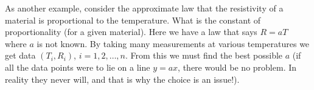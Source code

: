 \documentclass[preprint,  11pt]{amsart}
\newcommand{\para}[1]{\vspace{4mm}\noindent{\bfseries #1:}}
\theoremstyle{plain} %
\theoremstyle{definition} %
\begin{document}
As another example, consider the approximate law that the resistivity of a  material is proportional to the temperature. What is the constant of proportionality (for a given material). Here we have a law that says $R=aT$ where $a$ is not known. By taking many measurements at various temperatures we get data $(T_{i},R_{i})$, $i=1,2,\ldots ,n$. From this we must find the best possible $a$ (if all the data points were to lie on a line $y=ax$, there would be no problem. In reality they never will, and that is why the choice is an issue!).




\end{document}
